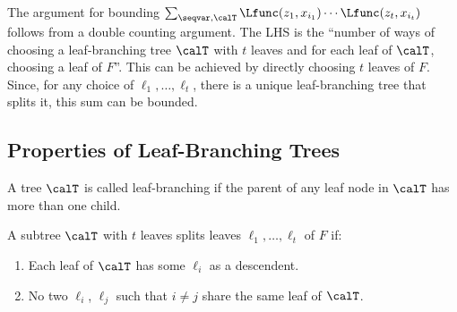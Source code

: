 The argument for bounding $\sum_{\seqvar, \calT} \Lfunc(z_1, x_{i_1}) \cdots \Lfunc(z_t,x_{i_t})$ follows from a double counting argument. The LHS is the ``number of ways of choosing a leaf-branching tree $\calT$ with $t$ leaves and for each leaf of $\calT$, choosing a leaf of $F$''. This can be achieved by directly choosing $t$ leaves of $F$. Since, for any choice of $\ell_1, \dots , \ell_t$, there is a unique leaf-branching tree that splits it, this sum can be bounded.

\subsection{Properties of Leaf-Branching Trees}
\label{sec:leaf-branching-trees-proof}

\begin{definition}
    A tree $\calT$ is called leaf-branching if the parent of any leaf node in $\calT$ has more than one child.
\end{definition}

\begin{definition}
    A subtree $\calT$ with $t$ leaves splits leaves $\ell_1,\dots ,\ell_t$ of $F$ if:
    \begin{enumerate}
        \item Each leaf of $\calT$ has some $\ell_i$ as a descendent.
        \item No two $\ell_i$, $\ell_j$ such that $i \neq j$ share the same leaf of $\calT$.
    \end{enumerate}
\end{definition}

